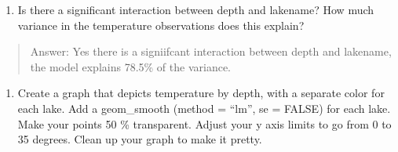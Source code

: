 \documentclass[]{article}
\newenvironment{Shaded}{\begin{snugshade}}{\end{snugshade}}
\newcommand{\CommentTok}[1]{\textcolor[rgb]{0.56,0.35,0.01}{\textit{#1}}}
\newcommand{\DataTypeTok}[1]{\textcolor[rgb]{0.13,0.29,0.53}{#1}}
\newcommand{\DecValTok}[1]{\textcolor[rgb]{0.00,0.00,0.81}{#1}}
\newcommand{\FloatTok}[1]{\textcolor[rgb]{0.00,0.00,0.81}{#1}}
\newcommand{\KeywordTok}[1]{\textcolor[rgb]{0.13,0.29,0.53}{\textbf{#1}}}
\newcommand{\NormalTok}[1]{#1}
\newcommand{\OperatorTok}[1]{\textcolor[rgb]{0.81,0.36,0.00}{\textbf{#1}}}
\newcommand{\OtherTok}[1]{\textcolor[rgb]{0.56,0.35,0.01}{#1}}
\newcommand{\StringTok}[1]{\textcolor[rgb]{0.31,0.60,0.02}{#1}}
\providecommand{\tightlist}{%
  \setlength{\itemsep}{0pt}\setlength{\parskip}{0pt}}
\begin{document}
\begin{enumerate}
\def\labelenumi{\arabic{enumi}.}
\setcounter{enumi}{6}
\tightlist
\item
  Is there a significant interaction between depth and lakename? How
  much variance in the temperature observations does this explain?
\end{enumerate}

\begin{quote}
Answer: Yes there is a signiifcant interaction between depth and
lakename, the model explains 78.5\% of the variance.
\end{quote}

\begin{enumerate}
\def\labelenumi{\arabic{enumi}.}
\setcounter{enumi}{7}
\tightlist
\item
  Create a graph that depicts temperature by depth, with a separate
  color for each lake. Add a geom\_smooth (method = ``lm'', se = FALSE)
  for each lake. Make your points 50 \% transparent. Adjust your y axis
  limits to go from 0 to 35 degrees. Clean up your graph to make it
  pretty.
\end{enumerate}

\begin{Shaded}
\end{Shaded}
\end{document}
